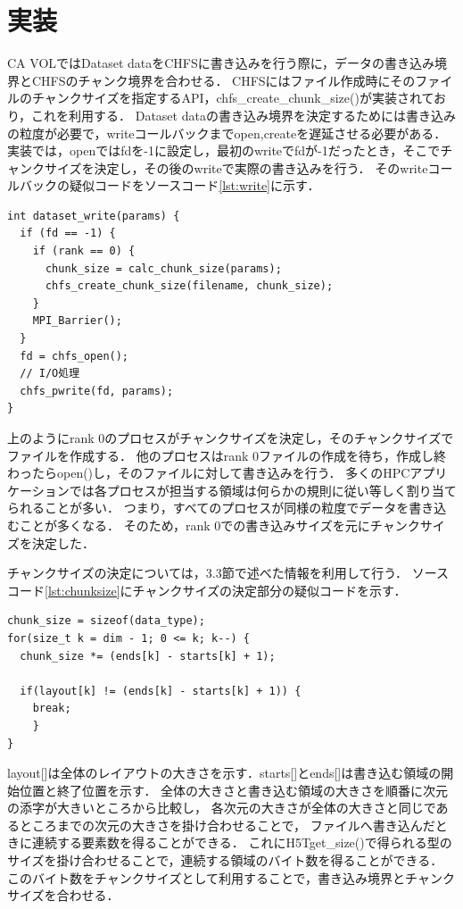 \documentclass[submit,techrep,noauthor]{ipsj}
\begin{document}
\section{実装}
CA VOLではDataset dataをCHFSに書き込みを行う際に，データの書き込み境界とCHFSのチャンク境界を合わせる．
CHFSにはファイル作成時にそのファイルのチャンクサイズを指定するAPI，chfs\_create\_chunk\_size()が実装されており，これを利用する．
Dataset dataの書き込み境界を決定するためには書き込みの粒度が必要で，writeコールバックまでopen,createを遅延させる必要がある．
実装では，openではfdを-1に設定し，最初のwriteでfdが-1だったとき，そこでチャンクサイズを決定し，その後のwriteで実際の書き込みを行う．
そのwriteコールバックの疑似コードをソースコード\ref{lst:write}に示す．
\begin{lstlisting}[caption=dataset writeのコード,label=lst:write]
int dataset_write(params) {
  if (fd == -1) {
    if (rank == 0) {
      chunk_size = calc_chunk_size(params);
      chfs_create_chunk_size(filename, chunk_size);
    }
    MPI_Barrier();
  }
  fd = chfs_open();
  // I/O処理
  chfs_pwrite(fd, params);
}
\end{lstlisting}
上のようにrank 0のプロセスがチャンクサイズを決定し，そのチャンクサイズでファイルを作成する．
他のプロセスはrank 0ファイルの作成を待ち，作成し終わったらopen()し，そのファイルに対して書き込みを行う．
多くのHPCアプリケーションでは各プロセスが担当する領域は何らかの規則に従い等しく割り当てられることが多い．
つまり，すべてのプロセスが同様の粒度でデータを書き込むことが多くなる．
そのため，rank 0での書き込みサイズを元にチャンクサイズを決定した．

チャンクサイズの決定については，3.3節で述べた情報を利用して行う．
ソースコード\ref{lst:chunksize}にチャンクサイズの決定部分の疑似コードを示す．
\begin{lstlisting}[caption=チャンクサイズの決定部分のソースコード(抜粋),label=lst:chunksize]
chunk_size = sizeof(data_type);
for(size_t k = dim - 1; 0 <= k; k--) {
  chunk_size *= (ends[k] - starts[k] + 1);

  if(layout[k] != (ends[k] - starts[k] + 1)) {
    break;
	}
}
\end{lstlisting}
layout[]は全体のレイアウトの大きさを示す．starts[]とends[]は書き込む領域の開始位置と終了位置を示す．
全体の大きさと書き込む領域の大きさを順番に次元の添字が大きいところから比較し，
各次元の大きさが全体の大きさと同じであるところまでの次元の大きさを掛け合わせることで，
ファイルへ書き込んだときに連続する要素数を得ることができる．
これにH5Tget\_size()で得られる型のサイズを掛け合わせることで，連続する領域のバイト数を得ることができる．
このバイト数をチャンクサイズとして利用することで，書き込み境界とチャンクサイズを合わせる．
\end{document}
